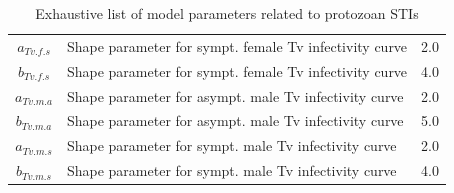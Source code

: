 \documentclass[11pt, onecolumn]{article}
\begin{document}
\begin{table}[htdp]
\begin{scriptsize}
\begin{center}
\begin{tabular}{|clc|}
$a_{Tv.f.s}$ & Shape parameter for sympt. female Tv infectivity curve & 2.0\\
$b_{Tv.f.s}$ & Shape parameter for sympt. female Tv infectivity curve & 4.0\\

$a_{Tv.m.a}$ & Shape parameter for asympt. male Tv infectivity curve & 2.0\\
$b_{Tv.m.a}$ & Shape parameter for asympt. male Tv infectivity curve & 5.0\\

$a_{Tv.m.s}$ & Shape parameter for sympt. male Tv infectivity curve & 2.0\\
$b_{Tv.m.s}$ & Shape parameter for sympt. male Tv infectivity curve & 4.0\\

\hline

\end{tabular}
\caption{Exhaustive list of model parameters related to protozoan STIs}
\label{tab:STIAllParamProtozoa}
\end{center}
\end{scriptsize}
\end{table}




\newpage



\end{document}
